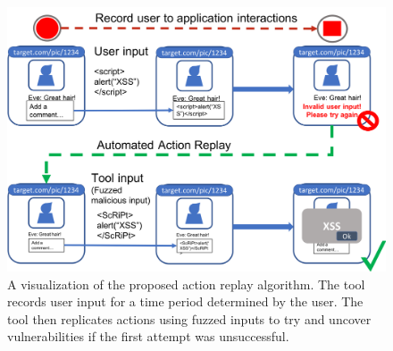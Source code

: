 \begin{itemize}
	\begin{figure}[h]
		\centering
		\includegraphics[width=\textwidth]{images/action_replay.png}
		\caption{A visualization of the proposed action replay algorithm. The tool records user input for a time period determined by the user. The tool then replicates actions using fuzzed inputs to try and uncover vulnerabilities if the first attempt was unsuccessful.}
		\label{fig:test}
	\end{figure}
	

\end{itemize}
